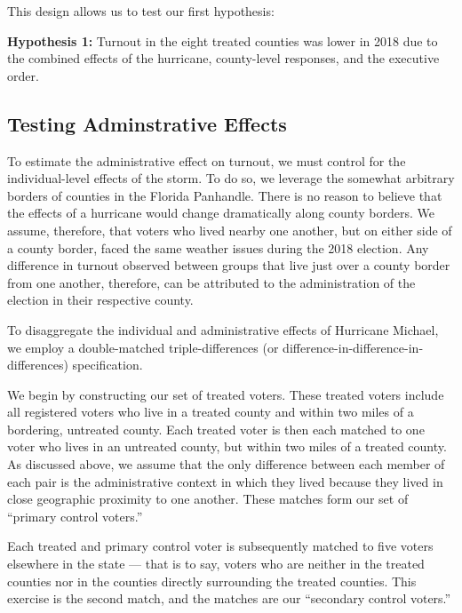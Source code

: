 \documentclass[
  12pt,
]{article}
\begin{document}
This design allows us to test our first hypothesis:

\textbf{Hypothesis 1:} Turnout in the eight treated counties was lower in 2018 due to the combined effects of the hurricane, county-level responses, and the executive order.

\hypertarget{testing-adminstrative-effects}{%
\subsection*{Testing Adminstrative Effects}\label{testing-adminstrative-effects}}

To estimate the administrative effect on turnout, we must control for the individual-level effects of the storm. To do so, we leverage the somewhat arbitrary borders of counties in the Florida Panhandle. There is no reason to believe that the effects of a hurricane would change dramatically along county borders. We assume, therefore, that voters who lived nearby one another, but on either side of a county border, faced the same weather issues during the 2018 election. Any difference in turnout observed between groups that live just over a county border from one another, therefore, can be attributed to the administration of the election in their respective county.

To disaggregate the individual and administrative effects of Hurricane Michael, we employ a double-matched triple-differences (or difference-in-difference-in-differences) specification.

We begin by constructing our set of treated voters. These treated voters include all registered voters who live in a treated county and within two miles of a bordering, untreated county. Each treated voter is then each matched to one voter who lives in an untreated county, but within two miles of a treated county. As discussed above, we assume that the only difference between each member of each pair is the administrative context in which they lived because they lived in close geographic proximity to one another. These matches form our set of ``primary control voters.''

Each treated and primary control voter is subsequently matched to five voters elsewhere in the state --- that is to say, voters who are neither in the treated counties nor in the counties directly surrounding the treated counties. This exercise is the second match, and the matches are our ``secondary control voters.''
\end{document}
